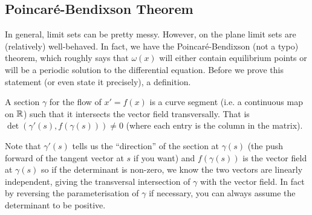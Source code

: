 \subsection{Poincaré-Bendixson Theorem}

In general, limit sets can be pretty messy. However, on the plane limit sets are (relatively) well-behaved. In fact, we have the Poincaré-Bendixson (not a typo) theorem, which roughly says that $\omega(x)$ will either contain equilibrium points or will be a periodic solution to the differential equation. Before we prove this statement (or even state it precisely), a definition.

\begin{definition}
A section $\gamma$ for the flow of $x' = f(x)$ is a curve segment (i.e. a continuous map on $\mathbb{R}$) such that it intersects the vector field transversally. That is $\det(\gamma'(s), f(\gamma(s))) \neq 0$ (where each entry is the column in the matrix).
\end{definition}
Note that $\gamma'(s)$ tells us the ``direction'' of the section at $\gamma(s)$ (the push forward of the tangent vector at $s$ if you want) and $f(\gamma(s))$ is the vector field at $\gamma(s)$ so if the determinant is non-zero, we know the two vectors are linearly independent, giving the transversal intersection of $\gamma$ with the vector field. In fact by reversing the parameterisation of $\gamma$ if necessary, you can always assume the determinant to be positive.

